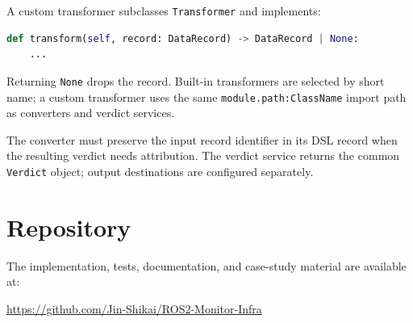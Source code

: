 A custom transformer subclasses \texttt{Transformer} and implements:

\begin{lstlisting}[language=Python]
def transform(self, record: DataRecord) -> DataRecord | None:
    ...
\end{lstlisting}

Returning \texttt{None} drops the record. Built-in transformers are selected
by short name; a custom transformer uses the same
\texttt{module.path:ClassName} import path as converters and verdict
services.

The converter must preserve the input record identifier in its DSL record when
the resulting verdict needs attribution. The verdict service returns the common
\texttt{Verdict} object; output destinations are configured separately.

\section{Repository}\label{app:repository}

The implementation, tests, documentation, and case-study material are available
at:

\begin{center}
\url{https://github.com/Jin-Shikai/ROS2-Monitor-Infra}
\end{center}
